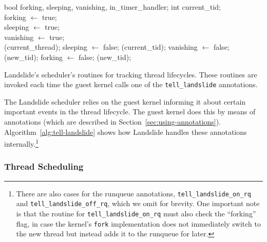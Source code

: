 \begin{algorithm}[t]
	\footnotesize
	\begin{algorithmic}
		\State bool forking, sleeping, vanishing, in\_timer\_handler;
		\State int current\_tid;
		\\
			\State forking $\gets$ true;
		\EndFunction
		\\
			\State sleeping $\gets$ true;
		\EndFunction
		\\
			\State vanishing $\gets$ true;
		\EndFunction
		\\
					(current\_thread);
					\State sleeping $\gets$ false;
					(current\_tid);
					\State vanishing $\gets$ false;
					(new\_tid);
					\State forking $\gets$ false;
				\EndIf
			\EndIf
			(new\_tid);
		\EndFunction
	\end{algorithmic}
	\caption{Landslide's scheduler's routines for tracking thread lifecycles. These routines are invoked each time the guest kernel calls one of the \texttt{tell\_landslide} annotations.}
	\label{alg:tell-landslide}
\end{algorithm}

The Landslide scheduler relies on the guest kernel informing it about certain important events in the thread lifecycle. The guest kernel does this by means of annotations (which are described in Section~\ref{sec:using-annotations}). Algorithm~\ref{alg:tell-landslide} shows how Landslide handles these annotations internally.\footnote{
There are also cases for the runqueue annotations, \texttt{tell\_landslide\_on\_rq} and \texttt{tell\_landslide\_off\_rq}, which we omit for brevity. One important note is that the routine for \texttt{tell\_landslide\_on\_rq} must also check the ``forking'' flag, in case the kernel's \texttt{fork} implementation does not immediately switch to the new thread but instead adds it to the runqueue for later.}

\subsubsection{Thread Scheduling}
\label{sec:components-inflight}

